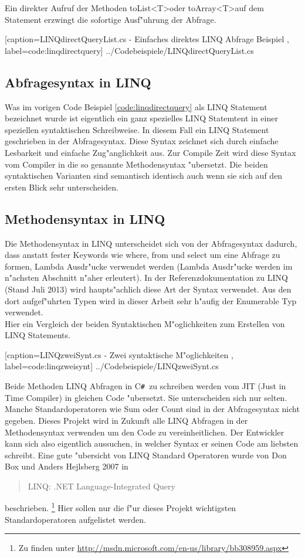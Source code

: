 \documentclass[pagesize, paper=a4, fontsize=12pt,titlepage=true, headings=small, headnosepline, abstractoff, liststotoc, nochapterprefix, plainheadsepline]{scrreprt}
\newcommand{\CSS}{C\texttt{\# }}
\newcommand{\GTS}{\textless T\textgreater\space}
\begin{document}
Ein direkter Aufruf der Methoden toList\GTS oder toArray\GTS auf dem Statement erzwingt die sofortige Ausf"uhrung der Abfrage.

			[caption={LINQdirectQueryList.cs - Einfaches direktes LINQ Abfrage Beispiel} \protect\cite{MicrosoftCReferenz.2013}, label=code:linqdirectquery]
			{../Codebeispiele/LINQdirectQueryList.cs}
		\subsection {Abfragesyntax in LINQ}
		Was im vorigen Code Beispiel \ref{code:linqdirectquery} als LINQ Statement bezeichnet wurde ist eigentlich ein ganz spezielles LINQ Statemtent in einer speziellen syntaktischen Schreibweise. In diesem Fall ein LINQ Statement geschrieben in der Abfragesyntax. Diese Syntax zeichnet sich durch einfache Lesbarkeit und einfache Zug"anglichkeit aus. Zur Compile Zeit wird diese Syntax vom Compiler in die so genannte Methodensyntax "ubersetzt. Die beiden syntaktischen Varianten sind semantisch identisch auch wenn sie sich auf den ersten Blick sehr unterscheiden.
		\subsection {Methodensyntax in LINQ}
		Die Methodensyntax in LINQ unterscheidet sich von der Abfragesyntax dadurch, dass anstatt fester Keywords wie where, from und select um eine Abfrage zu formen, Lambda Ausdr"ucke verwendet werden (Lambda Ausdr"ucke werden im n"achsten Abschnitt n"aher erleutert). In der Referenzdokumentation zu LINQ (Stand Juli 2013) \cite{MicrosoftCReferenz.2013} wird haupts"achlich diese Art der Syntax verwendet. Aus den dort aufgef"uhrten Typen wird in dieser Arbeit sehr h"aufig der Enumerable Typ verwendet.
\\
Hier ein Vergleich der beiden Syntaktischen M"oglichkeiten zum Erstellen von LINQ Statements.

			[caption={LINQzweiSynt.cs - Zwei syntaktische M"oglichkeiten} \protect\cite{MicrosoftCReferenz.2013}, label=code:linqzweisynt]
			{../Codebeispiele/LINQzweiSynt.cs}

Beide Methoden LINQ Abfragen in \CSS zu schreiben werden vom JIT (Just in Time Compiler) in gleichen Code "ubersetzt. Sie unterscheiden sich nur selten. Manche Standardoperatoren wie Sum oder Count sind in der Abfragesyntax nicht gegeben. Dieses Projekt wird in Zukunft alle LINQ Abfragen in der Methodensyntax verwenden um den Code zu vereinheitlichen. Der Entwickler kann sich also eigentlich aussuchen, in welcher Syntax er seinen Code am liebsten schreibt. Eine gute "ubersicht von LINQ Standard Operatoren wurde von Don Box und Anders Hejlsberg 2007 in \begin{quote}LINQ: .NET Language-Integrated Query \cite[Standard Query Operators in a Nutshell]{Box.2007}\end{quote} beschrieben. \footnote{Zu finden unter \url{http://msdn.microsoft.com/en-us/library/bb308959.aspx}}
\newpage
Hier sollen nur die f"ur dieses Projekt wichtigsten Standardoperatoren aufgelistet werden.
\newline
\end{document}
